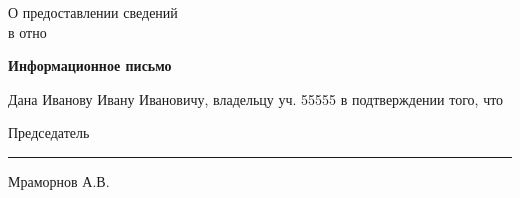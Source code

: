 \begin{flushleft}
О предоставлении сведений\\
в отно
\end{flushleft}
\vspace{10mm}
\begin{center}
	\Large\textbf{Информационное письмо}
\end{center}
\par

Дана Иванову Ивану Ивановичу, владельцу уч. 55555 в подтверждении того, что 

\vspace{35mm}
Председатель \hfill    \rule{4cm}{0.1 mm}    Мраморнов А.В.




